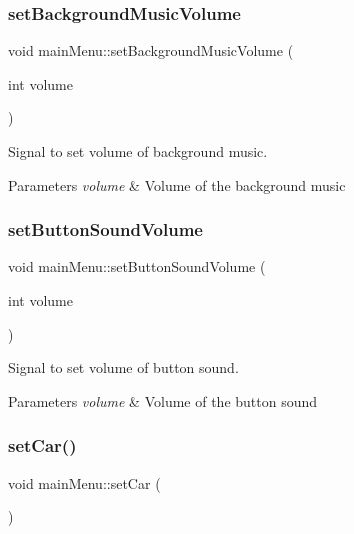 \subsubsection{\texorpdfstring{setBackgroundMusicVolume}{setBackgroundMusicVolume}}
{\footnotesize\ttfamily void main\+Menu\+::set\+Background\+Music\+Volume (\begin{DoxyParamCaption}\item[{int}]{volume }\end{DoxyParamCaption})\hspace{0.3cm}{\ttfamily [signal]}}



Signal to set volume of background music. 


\begin{DoxyParams}{Parameters}
{\em volume} & Volume of the background music \\
\hline
\end{DoxyParams}
\mbox{\label{classmain_menu_a21a2d9d232738a64061628b988c15a30}} 
\subsubsection{\texorpdfstring{setButtonSoundVolume}{setButtonSoundVolume}}
{\footnotesize\ttfamily void main\+Menu\+::set\+Button\+Sound\+Volume (\begin{DoxyParamCaption}\item[{int}]{volume }\end{DoxyParamCaption})\hspace{0.3cm}{\ttfamily [signal]}}



Signal to set volume of button sound. 


\begin{DoxyParams}{Parameters}
{\em volume} & Volume of the button sound \\
\hline
\end{DoxyParams}
\mbox{\label{classmain_menu_a413157b043b173cb7b5a81f0deab931c}} 
\subsubsection{\texorpdfstring{setCar()}{setCar()}}
{\footnotesize\ttfamily void main\+Menu\+::set\+Car (\begin{DoxyParamCaption}{ }\end{DoxyParamCaption})}




